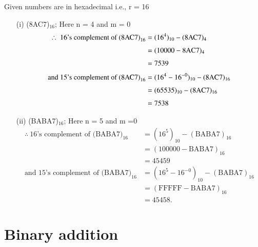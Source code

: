 \begin{solution}
Given numbers are in hexadecimal i.e., r = 16
\begin{itemize}
\item[(i)] (8AC7)$_{16}$\qquad ; Here n = 4 and m = 0
\begin{align*}
\therefore~ \text{16's complement of (8AC7)}_{16} &= (16^{4})_{10}-(\text{8AC7})_{4}\\[3pt]
&= (10000-8\textrm{A}\textrm{C} 7)_{4}\\[3pt]
&= 7539\\[3pt]
\text{and 15's complement of (8AC7)}_{16} &= (16^{4}-16^{-0})_{10}-(8\textrm{A}\textrm{C} 7)_{16}\\[3pt]
&= (65535)_{10}-(8\textrm{A}\textrm{C} 7)_{16}\\[3pt]
&= 7538
\end{align*}

\item[(ii)] (BABA7)$_{16}$\qquad ; Here n = 5 and m =0
\begin{align*}
\therefore~ \text{16's complement of (BABA7)}_{16} &= (16^{5})_{10}-(\text{BABA7})_{16}\\[3pt]
&= (100000-\text{BABA7})_{16}\\[3pt]
&= 45459\\[3pt]
\text{and 15's complement of (BABA7)}_{16} &= (16^{5}-16^{-0})_{10}-(\text{BABA7})_{16}\\[3pt]
&= (\text{FFFFF}-\text{BABA7})_{16}\\[3pt]
&= 45458.
\end{align*}
\end{itemize}
\end{solution}

\section{Binary addition}\label{sec5.5}

